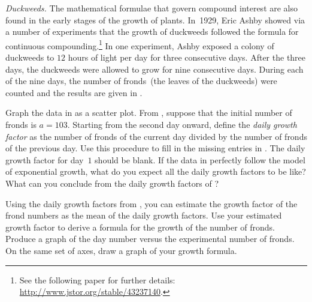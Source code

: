 \documentclass[a4paper,oneside,12pt]{article}
\begin{document}
\begin{problem}
\begin{table}[!htbp]
\centering

\caption{%
  The experimental number of fronds in a colony of duckweeds, counted
  each day for nine consecutive days.  Before the first day, the
  colony had been exposed to $12$ hours of light per day for three
  consecutive days.  The missing entries should contain the daily
  growth factors.
}
\label{tab:duckweed_frond12_missing}
\end{table}

\item\label{prob:duckweeds}
  \emph{Duckweeds.}
  The mathematical formulae that govern compound interest are also
  found in the early stages of the growth of plants.  In~1929, Eric
  Ashby showed via a number of experiments that the growth of
  duckweeds followed the formula for continuous compounding.\footnote{
    See the following paper for further details:
    \url{http://www.jstor.org/stable/43237140}.
  }
  In one experiment, Ashby exposed a colony of duckweeds to $12$ hours
  of light per day for three consecutive days.  After the three days,
  the duckweeds were allowed to grow for nine consecutive days.
  During each of the nine days, the number of fronds~(the leaves of
  the duckweeds) were counted and the results are given in
  .
  \begin{packedenum}
  \item\label{subprob:duckweeds_growth_factor}
    Graph the data in  as a
    scatter plot.  From , suppose
    that the initial number of fronds is $a = 103$.  Starting from the
    second day onward, define the \emph{daily growth factor} as the
    number of fronds of the current day divided by the number of
    fronds of the previous day.  Use this procedure to fill in the
    missing entries in .  The
    daily growth factor for day~$1$ should be blank.  If the data in
     perfectly follow the model of
    exponential growth, what do you expect all the daily growth
    factors to be like?  What can you conclude from the daily growth
    factors of ?

  \item\label{subprob:duckweeds_growth_factor_estimate}
    Using the daily growth factors
    from , you can estimate the
    growth factor of the frond numbers as the mean of the daily growth
    factors.  Use your estimated growth factor to derive a formula for
    the growth of the number of fronds.  Produce a graph of the day
    number versus the experimental number of fronds.  On the same set
    of axes, draw a graph of your growth formula.


\end{packedenum}
\end{problem}
\end{document}

